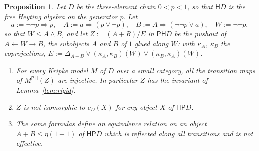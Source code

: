\documentclass[11pt]{amsart}
\newtheorem{prop}[thm]{Proposition}
\theoremstyle{definition}
\newcommand{\PP}{\mathsf P}
\newcommand{\HH}{\mathsf H}
\begin{document}
\begin{prop}\label{prop:notsuff}
Let $D$ be the three-element chain $0<p<1$, so that $\HH D$ is the free
Heyting algebra on the generator $p$. Let
\[
a:=\neg\neg p\Rightarrow p,\quad A:=a\Rightarrow(p\vee\neg p),\quad
B:=A\Rightarrow(\neg\neg p\vee a),\quad W:=\neg\neg p,
\]
so that $W\le A\wedge B$, and let $Z:=(A+B)/E$ in $\PP\HH D$ be the
pushout of $A\leftarrow W\to B$, the subobjects $A$ and $B$ of $1$
glued along $W$: with $\kappa_A$, $\kappa_B$ the coprojections,
$E:=\Delta_{A+B}\vee(\kappa_A,\kappa_B)(W)\vee(\kappa_B,\kappa_A)(W)$.
\begin{enumerate}
\item[(a)] For every Kripke model $M$ of $D$ over a small category,
all the transition maps of $M^{\PP\HH}(Z)$ are injective. In particular
$Z$ has the invariant of Lemma~\ref{lem:rigid}.
\item[(b)] $Z$ is not isomorphic to $c_D(X)$ for any object $X$ of
$\HH\PP D$.
\item[(c)] The same formulas define an equivalence relation on an
object $A+B\le\eta(1+1)$ of $\HH\PP D$ which is reflected along all
transitions and is not effective.
\end{enumerate}
\end{prop}
\end{document}
